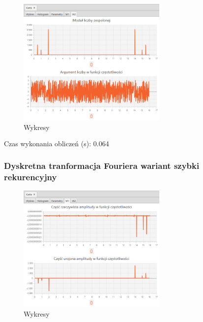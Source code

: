 \documentclass[12pt]{article}
\begin{document}
{{{                \begin{figure}[H]
                    \centering
                    \includegraphics[width=0.65\textwidth]{img/result/s2/02/W2_draw_2_sinus_sampling_trans_s2_data_205744.png}
                    \caption{Wykresy}
                \end{figure}

                Czas wykonania obliczeń (s): 0.064
            }
            \newpage

            \subsubsection{Dyskretna tranformacja Fouriera wariant szybki rekurencyjny} {

                \begin{figure}[H]
                    \centering
                    \includegraphics[width=0.65\textwidth]{img/result/s2/03/W1_draw_3_sinus_sampling_trans_s2_data_205751.png}
                    \caption{Wykresy}
                \end{figure}

}}}
\end{document}
